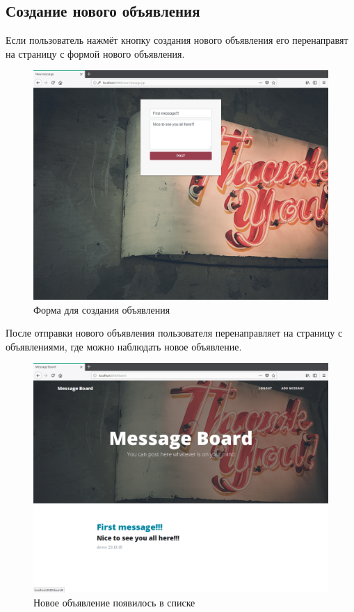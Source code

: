\documentclass{article}
\begin{document}
    \subsection{Создание нового объявления}
	Если пользователь нажмёт кнопку создания нового объявления его перенаправят на страницу с формой нового объявления.
    \begin{figure}[H]
        \begin{flushleft}
            \centerline{\includegraphics[scale=0.3]{newmessage.png}}
            \caption{Форма для создания объявления}
        \end{flushleft}
    \end{figure}

	После отправки нового объявления пользователя перенаправляет на страницу с объявлениями, где можно наблюдать новое объявление.
    \begin{figure}[H]
        \begin{flushleft}
            \centerline{\includegraphics[scale=0.3]{user.png}}
            \caption{Новое объявление появилось в списке}
        \end{flushleft}
    \end{figure}
\end{document}

